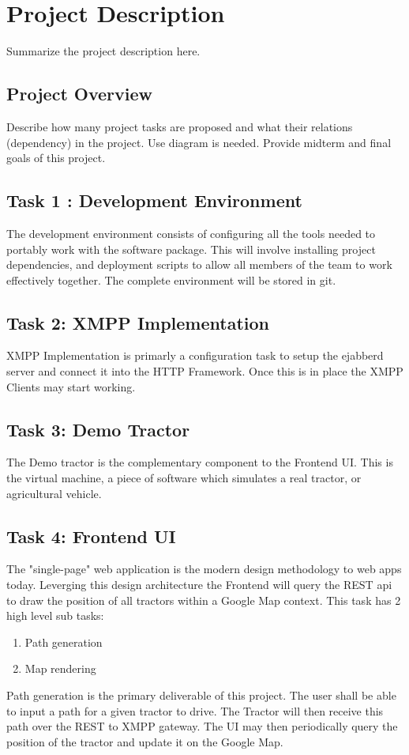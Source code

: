 \documentclass[conference,12pt]{IEEEtran}
\begin{document}
\section{Project Description}
Summarize the project description here.
\subsection{Project Overview}
Describe how many project tasks are proposed and what their relations (dependency) in the project. Use diagram is needed. Provide midterm and final goals of this project.
\subsection{Task 1 : Development Environment}
The development environment consists of configuring all the tools needed to
portably work with the software package. This will involve installing project
dependencies, and deployment scripts to allow all members of the team to work
effectively together. The complete environment will be stored in git.
\subsection{Task 2: XMPP Implementation}
XMPP Implementation is primarly a configuration task to setup the ejabberd
server and connect it into the HTTP Framework. Once this is in place the XMPP
Clients may start working.
\subsection{Task 3: Demo Tractor}
The Demo tractor is the complementary component to the Frontend UI. This is the
virtual machine, a piece of software which simulates a real tractor, or
agricultural vehicle. 
\subsection{Task 4: Frontend UI}
The "single-page" web application is the modern design methodology to web apps
today. Leverging this design architecture the Frontend will query the REST api
to draw the position of all tractors within a Google Map context. This task has
2 high level sub tasks:
\begin{enumerate}
\item Path generation
\item Map rendering
\end{enumerate}
Path generation is the primary deliverable of this project. The user shall be
able to input a path for a given tractor to drive. The Tractor will then receive
this path over the REST to XMPP gateway.  The UI may then periodically query the
position of the tractor and update it on the Google Map.
\end{document}
